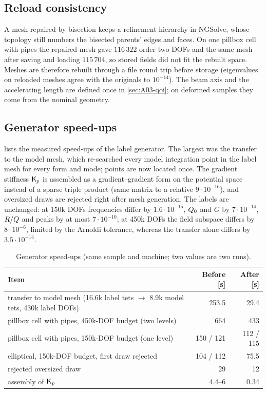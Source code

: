 \subsection{Reload consistency}\label{sec:A05-reload}

A mesh repaired by bisection keeps a refinement hierarchy in NGSolve, whose topology still numbers the bisected parents' edges and faces.
On one pillbox cell with pipes the repaired mesh gave $116\,322$ order-two DOFs and the same mesh after saving and loading $115\,704$, so stored fields did not fit the rebuilt space.
Meshes are therefore rebuilt through a file round trip before storage (eigenvalues on reloaded meshes agree with the originals to $10^{-14}$).
The beam axis and the accelerating length are defined once in \cref{sec:A03-qoi}; on deformed samples they come from the nominal geometry.

\subsection{Generator speed-ups}\label{sec:A05-speedup}

 lists the measured speed-ups of the label generator.
The largest was the transfer to the model mesh, which re-searched every model integration point in the label mesh for every form and mode; points are now located once.
The gradient stiffness $\Kp$ is assembled as a gradient--gradient form on the potential space instead of a sparse triple product (same matrix to a relative $9\cdot10^{-16}$), and oversized draws are rejected right after mesh generation.
The labels are unchanged: at 150k DOFs frequencies differ by $1.6\cdot10^{-15}$, $\Qz$ and $G$ by $7\cdot10^{-14}$, $R/Q$ and peaks by at most $7\cdot10^{-10}$; at 450k DOFs the field subspace differs by $8\cdot10^{-6}$, limited by the Arnoldi tolerance, whereas the transfer alone differs by $3.5\cdot10^{-14}$.

\begin{table}[ht]
\centering
\caption{Generator speed-ups (same sample and machine; two values are two runs).}
\label{tab:A05-speedup}
\small
\begin{tabular}{@{}lrr@{}}
\toprule
Item & Before [s] & After [s] \\
\midrule
transfer to model mesh (16.6k label tets $\to$ 8.9k model tets, 430k label DOFs) & 253.5 & 29.4 \\
pillbox cell with pipes, 450k-DOF budget (two levels) & 664 & 433 \\
pillbox cell with pipes, 150k-DOF budget (one level) & 150 / 121 & 112 / 115 \\
elliptical, 150k-DOF budget, first draw rejected & 104 / 112 & 75.5 \\
rejected oversized draw & 29 & 12 \\
assembly of $\Kp$ & 4.4--6 & 0.34 \\
\bottomrule
\end{tabular}
\end{table}
